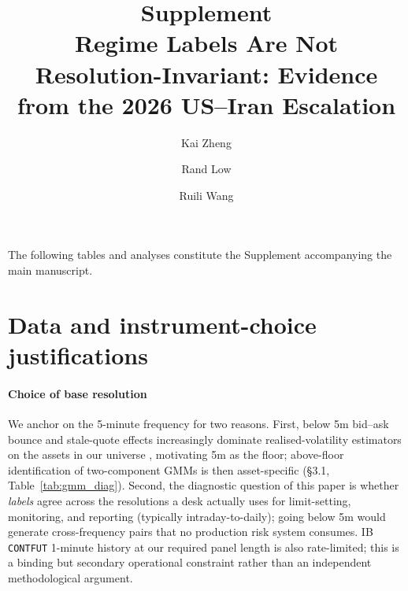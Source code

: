 \documentclass[preprint,12pt,authoryear]{elsarticle}
\def\corref#1{}%
\begin{document}
\begin{frontmatter}
\sloppy

\title{{\large Supplement}\\[8pt] Regime Labels Are Not Resolution-Invariant: Evidence from the 2026 US--Iran Escalation}

\author[1]{Kai Zheng}
\author[2]{Rand Low}
\author[1]{Ruili Wang\corref{cor1}}




\end{frontmatter}
\sloppy  %

\renewcommand{\thesection}{S\arabic{section}}
\renewcommand{\thetable}{S\arabic{table}}
\renewcommand{\thefigure}{S\arabic{figure}}
\renewcommand{\theequation}{S\arabic{equation}}

The following tables and analyses constitute the Supplement accompanying the main manuscript.

\section{Data and instrument-choice justifications}\label{app:data_choices}

\paragraph{Choice of base resolution}
We anchor on the 5-minute frequency for two reasons. First, below 5m bid--ask bounce and stale-quote effects increasingly dominate realised-volatility estimators on the assets in our universe \citep{AitSahaliaMykland2005,Andersen1999RealizedVolatility}, motivating 5m as the floor; above-floor identification of two-component GMMs is then asset-specific (\S{}3.1, Table~\ref{tab:gmm_diag}). Second, the diagnostic question of this paper is whether \emph{labels} agree across the resolutions a desk actually uses for limit-setting, monitoring, and reporting (typically intraday-to-daily); going below 5m would generate cross-frequency pairs that no production risk system consumes. IB \texttt{CONTFUT} 1-minute history at our required panel length is also rate-limited; this is a binding but secondary operational constraint rather than an independent methodological argument.
\end{document}
